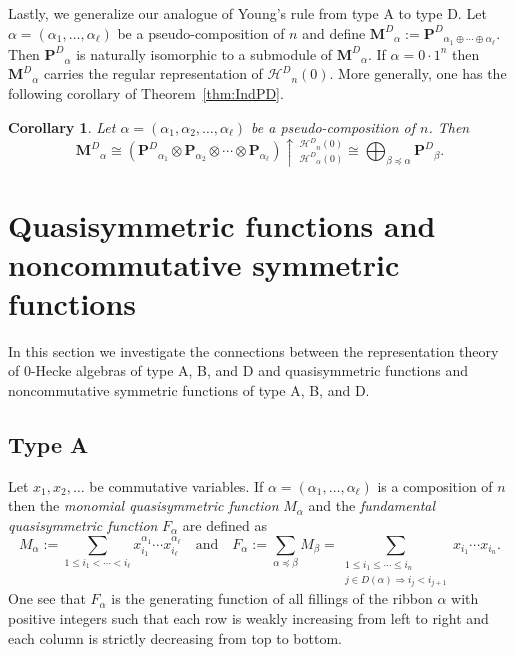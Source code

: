 \documentclass{amsart}
\newtheorem{corollary}[theorem]{Corollary}
\newtheorem*{Young's Rule}{Young's Rule}
\theoremstyle{definition}
\theoremstyle{remark}
\numberwithin{equation}{section}
\begin{document}
Lastly, we generalize our analogue of Young's rule from type A to type D. Let $\alpha=(\alpha_1,\ldots,\alpha_\ell)$ be a pseudo-composition of $n$ and define ${\mathbf{M}^D}_\alpha := {\mathbf{P}^D}_{\alpha_1\oplus\cdots\oplus\alpha_\ell}$. Then ${\mathbf{P}^D}_\alpha$ is naturally isomorphic to a submodule of ${\mathbf{M}^D}_\alpha$. If $\alpha=0\cdot 1^n$ then ${\mathbf{M}^D}_\alpha$ carries the regular representation of ${\mathcal{H}^D}_n(0)$. More generally, one has the following corollary of Theorem~\ref{thm:IndPD}.

\begin{corollary}
Let $\alpha=(\alpha_1,\alpha_2,\ldots,\alpha_\ell)$ be a pseudo-composition of $n$. Then 
\[ {\mathbf{M}^D}_\alpha\cong \left( {\mathbf{P}^D}_{\alpha_1} \otimes {\mathbf{P}}_{\alpha_2} \otimes\cdots \otimes {\mathbf{P}}_{\alpha_\ell} \right) \uparrow\,_{{\mathcal{H}^D}_\alpha(0)}^{{\mathcal{H}^D}_n(0)} \cong \bigoplus_{\beta{\operatorname{\preccurlyeq}}\alpha} {\mathbf{P}^D}_\beta. \]
\end{corollary}

\section{Quasisymmetric functions and noncommutative symmetric functions}\label{sec:Char}

In this section we investigate the connections between the representation theory of 0-Hecke algebras of type A, B, and D and quasisymmetric functions and noncommutative symmetric functions of type A, B, and D.

\subsection{Type A}

Let $x_1,x_2,\ldots$ be commutative variables. If $\alpha=(\alpha_1,\ldots,\alpha_\ell)$ is a composition of $n$ then the \emph{monomial quasisymmetric function} $M_\alpha$ and the \emph{fundamental quasisymmetric function} $F_\alpha$ are defined as
\[ M_\alpha:=\sum_{1\leq i_1<\cdots<i_\ell} x_{i_1}^{\alpha_1}\cdots x_{i_\ell}^{\alpha_\ell}
{\quad\text{and}\quad} F_\alpha:=\sum_{\alpha{\operatorname{\preccurlyeq}}\beta}M_\beta = \sum_{ \substack{ 1\le i_1\le \cdots\le i_n\\ j\in D(\alpha) \Rightarrow i_j<i_{j+1} }} x_{i_1}\cdots x_{i_n}. \]
One see that $F_\alpha$ is the generating function of all fillings of the ribbon $\alpha$ with positive integers such that each row is weakly increasing from left to right and each column is strictly decreasing from top to bottom. 
\end{document}
